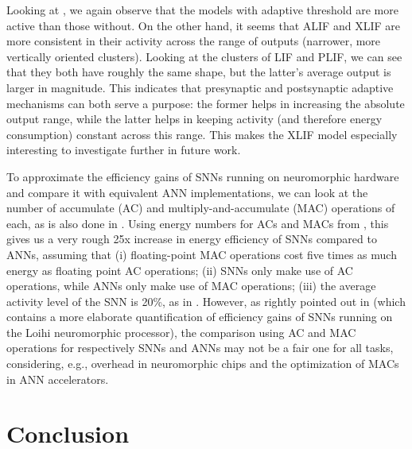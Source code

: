 Looking at , we again observe that the models with adaptive threshold are more active than those without. On the other hand, it seems that ALIF and XLIF are more consistent in their activity across the range of outputs (narrower, more vertically oriented clusters). Looking at the clusters of LIF and PLIF, we can see that they both have roughly the same shape, but the latter's average output is larger in magnitude. This indicates that presynaptic and postsynaptic adaptive mechanisms can both serve a purpose: the former helps in increasing the absolute output range, while the latter helps in keeping activity (and therefore energy consumption) constant across this range. This makes the XLIF model especially interesting to investigate further in future work.

To approximate the efficiency gains of SNNs running on neuromorphic hardware and compare it with equivalent ANN implementations, we can look at the number of accumulate (AC) and multiply-and-accumulate (MAC) operations of each, as is also done in \cite{yin2021accurate}. Using energy numbers for ACs and MACs from \cite{horowitz201411}, this gives us a very rough 25x increase in energy efficiency of SNNs compared to ANNs, assuming that (i) floating-point MAC operations cost five times as much energy as floating point AC operations; (ii) SNNs only make use of AC operations, while ANNs only make use of MAC operations; (iii) the average activity level of the SNN is 20\%, as in . However, as rightly pointed out in \cite{davies2021advancing} (which contains a more elaborate quantification of efficiency gains of SNNs running on the Loihi neuromorphic processor), the comparison using AC and MAC operations for respectively SNNs and ANNs may not be a fair one for all tasks, considering, e.g., overhead in neuromorphic chips and the optimization of MACs in ANN accelerators.

\section{Conclusion}


